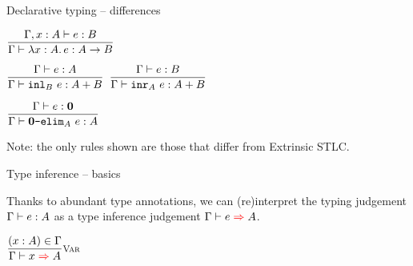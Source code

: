 \documentclass{beamer}
\begin{document}
\begin{frame}{Declarative typing -- differences}

\begin{center}
  $\infrule{\typing[\extend{\Gamma}{x}{A}]{e}{B}}{\typing{\fun{x}[A]{e}}{\Fun{A}{B}}}$

  \vspace{2em}

  $\infrule{\typing{e}{A}}{\typing{\inl[B]{e}}{\Sum{A}{B}}}$ \quad
  $\infrule{\typing{e}{B}}{\typing{\inr[A]{e}}{\Sum{A}{B}}}$

  \vspace{2em}

  $\infrule{\typing{e}{\Empty}}{\typing{\emptyelim[A]{e}}{A}}$
\end{center}

\vspace{2em}

Note: the only rules shown are those that differ from Extrinsic STLC.

\end{frame}

\begin{frame}{Type inference -- basics}

Thanks to abundant type annotations, we can (re)interpret the typing judgement $\typing[\Gamma]{e}{A}$ as a type inference judgement $\infer[\Gamma]{e}{A}$.

\vspace{2em}

\begin{center}
  $\infrule[Var]{\sidecond{(x : A) \in \Gamma}}{\infer{x}{A}}$
\end{center}

\end{frame}
\end{document}
